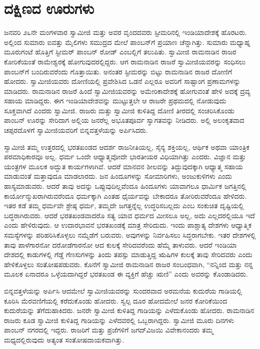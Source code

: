 
\chapter{ದಕ್ಷಿಣದ ಊರುಗಳು}

 ಜನವರಿ ೨೬ನೇ ಮಂಗಳವಾರ ಸ್ವಾಮೀಜಿ ಮತ್ತು ಅವರ ವೃಂದದವರು ಸ್ಟೀಮರಿನಲ್ಲಿ ಇಂಡಿಯಾದೇಶಕ್ಕೆ ಹೊರಟರು. ಅಲ್ಲಿಂದ ಸುಮಾರು ಐವತ್ತು ಮೈಲಿಗಳು ಸಮುದ್ರದ ಮೇಲೆ ಪಾಂಬನ್‌ಗೆ ಪ್ರಯಾಣ ಚೆನ್ನಾಗಿತ್ತು. ಸುಮಾರು ಮಧ್ಯಾಹ್ನ ಮೂರುಗಂಟೆ ಹೊತ್ತಿಗೆ ಸ್ಟೀಮರ್ ಪಾಂಬನ್ ರೋಡ್ ಎಂಬಲ್ಲಿಗೆ ತಲುಪಿತು. ಸ್ವಾಮೀಜಿ ರಾಮನಾಡಿನ ರಾಜರ ಕೋರಿಕೆಯಂತೆ ರಾಮೇಶ್ವರಕ್ಕೆ ಹೋಗುವುದರಲ್ಲಿದ್ದರು. ಆಗ ರಾಮನಾಡಿನ ರಾಜರೆ ಸ್ವಾಮೀಜಿಯವರನ್ನು ಸಂಧಿಸಲು ಪಾಂಬನ್‌ಗೆ ಬಂದಿರುವರೆಂದು ಗೊತ್ತಾಯಿತು. ಅನಂತರ ಸ್ಟೀಮರನ್ನು ಬಿಟ್ಟು ರಾಮನಾಡಿನ ರಾಜರ ದೋಣಿಗೆ ಹೋದರು. ಸ್ವಾಮೀಜಿಯವರು ದೋಣಿಯಲ್ಲಿ ಪ್ರವೇಶಿಸಿದ ಒಡನೆ ಎಲ್ಲರೂ ಅವರಿಗೆ ಸಾಷ್ಟಾಂಗ ಪ್ರಣಾಮಗಳನ್ನು ಮಾಡಿದರು. ರಾಮನಾಡಿನ ರಾಜರೆ ಹಿಂದೆ ಸ್ವಾಮೀಜಿಯವರನ್ನು ಅಮೇರಿಕಾದೇಶಕ್ಕೆ ಹೋಗುವಂತೆ ಹೇಳಿ ಅದಕ್ಕೆ ದ್ರವ್ಯ ಸಹಾಯ ಮಾಡಿದ್ದರು. ಈಗ ಇಂಡಿಯಾದೇಶವನ್ನು ಮುಟ್ಟುತ್ತಲೇ ಆ ರಾಜರೇ ಪ್ರಥಮದಲ್ಲಿ ನೋಡುವುದು ಸೂಕ್ತವಾಗಿದೆ ಎಂದರು ಸ್ವಾಮೀಜಿ. ರಾಜರು ಮತ್ತು ಸ್ವಾಮೀಜಿ ಕುಳಿತಿದ್ದ ದೋಣಿ ತೀರದಲ್ಲಿ ಸಂಚರಿಸಿಕೊಂಡು ಪಾಂಬನ್ ಊರನ್ನು ಸೇರಿದಾಗ ಅಲ್ಲಿಯ ಜನರೆಲ್ಲ ಅಭೂತಪೂರ್ವ ಸ್ವಾಗತವನ್ನು ನೀಡಿದರು. ಅಲ್ಲಿ ಅಲಂಕೃತವಾದ ಚಪ್ಪರದೊಳಗೆ ಸ್ವಾಮೀಜಿಯವರಿಗೆ ಬಿನ್ನವತ್ತಳೆಯನ್ನು ಅರ್ಪಿಸಿದರು. 

 ಸ್ವಾಮೀಜಿ ತಮ್ಮ ಉತ್ತರದಲ್ಲಿ ಭರತಖಂಡದ ಆದರ್ಶ ರಾಜನೀತಿಯಲ್ಲ, ಸೈನ್ಯ ಶಕ್ತಿಯಲ್ಲ, ಆರ್ಥಿಕ ಅಥವಾ ಯಾಂತ್ರಿಕ ಪರಮಾಧಿಕಾರವೂ ಅಲ್ಲ. ಧರ್ಮ ಒಂದೇ ಆಧ್ಯಾತ್ಮವೋದೇ ಭಾರತೀಯರ ವಿಧಿಯಾಗಿತ್ತು ಎಂದರು. ವಿಜ್ಞಾನ ಮತ್ತು ಯಂತ್ರಗಳ ಮೂಲಕ ಅದ್ಭುತ ಕಾರ್ಯಗಳಾಗಿವೆ. ಆದರೆ ಮಾನವನ ಶೀಲವನ್ನು ತಿದ್ದುವುದಕ್ಕಾಗಿ ಆಧ್ಯಾತ್ಮ ಸಹಾಯ ಮಾಡುವಂತೆ ಮತ್ತಾವುದೂ ಮಾಡಲಾರದು. ಜನ ಹಿಂದೂಗಳನ್ನು ಸೋಮಾರಿಗಳು, ಅಂಜುಕುಳಿಗಳು ಎಂದು ಹಾಸ್ಯಮಾಡುವರು. ಆದರೆ ತಾವು ಅದನ್ನು ಒಪ್ಪುವುದಿಲ್ಲವೆಂದೂ ಹಿಂದೂಗಳು ಯಾವಾಗಲೂ ಧಾರ್ಮಿಕ ಜಗತ್ತಿನಲ್ಲಿ ಕಾರ್ಯೋನ್ಮುಖರಾಗಿರುವರೆಂದೂ ಧರ್ಮಕ್ಕಾಗಿ ಎಂತಹ ಧೈರ್ಯವನ್ನು ಬೇಕಾದರೂ ತೋರಿರುವರೆಂದೂ ಹೇಳಿದರು. ಇತರ ಕಡೆ ತಮ್ಮ ಧರ್ಮವೇ ಶ್ರೇಷ್ಠ ಧರ್ಮ, ತಮ್ಮದೇ ಜಗತ್ತನ್ನೆಲ್ಲ ಉದ್ಧರಿಸಬಲ್ಲದು ಎಂಬ ಸಂಕುಚಿತ ದೃಷ್ಟಿಯಲ್ಲಿ ಬದ್ಧರಾಗಿರುವರು. ಆದರೆ ಭರತಖಂಡವಾದರೊ ಸತ್ಯ ಯಾವ ಧರ್ಮದ ಮೀಸಲೂ ಅಲ್ಲ, ಅದು ಎಲ್ಲದರಲ್ಲಿಯೂ ಇದೆ ಎಂದು ಹೇಳಿರುವುದು. ಆ ಉದಾರಭಾವನೆ ಭರತಖಂಡಕ್ಕೆ ಮಾತ್ರ ಸೇರಿದುದು. ಇಂದು ಪಾಶ್ಚಾತ್ಯ ದೇಶಗಳು ಆಧ್ಯಾತ್ಮಿಕ ಸಮಸ್ಯೆಗಳನ್ನು ಪರಿಹರಿಸಿಕೊಳ್ಳಲು ನಮ್ಮೆಡೆಗೆ ಬರುವರು. ಅವುಗಳನ್ನು ನಿರ್ವಹಿಸಲು ಸಿದ್ಧರಾಗಬೇಕು. ಇತರ ದೇಶಗಳಲ್ಲಿ ತಾವು ಪಾಳೆಗಾರನೋ ದರೋಡೆಗಾರನೋ ಆದ ಕುಲಕ್ಕೆ ಸೇರಿದವರೆಂದು ಹೆಮ್ಮೆ ತಾಳುವರು. ಆದರೆ ಇಂಡಿಯಾ ದೇಶದಲ್ಲಿ ಕಾಡುಗಳಲ್ಲಿ ಗೆಡ್ಡೆ ಗೆಣಸುಗಳನ್ನು ತಿಂದು ತಪಸ್ಸು ಮಾಡುತ್ತಿದ್ದ ಋಷಿಗಳ ಕುಲಕ್ಕೆ ತಾವು ಸೇರಿದವರು ಎಂದು ಹೇಳಿಕೊಳ್ಳಲು ಸಂತೋಷಪಡುವರು. ಕೊನೆಗೆ ಸ್ವಾಮೀಜಿ ರಾಮನಾಡಿನ ರಾಜರ ಸಂಬಂಧವಾಗಿ, “ನನ್ನಿಂದ ಮತ್ತು ನನ್ನ ಮೂಲಕ ಏನಾದರೂ ಒಳ್ಳೆಯದಾಗಿದ್ದರೆ ಭರತಖಂಡ ಈ ವ್ಯಕ್ತಿಗೆ ಹೆಚ್ಚು ಋಣಿ” ಎಂದು ಅವರನ್ನು ಕೊಂಡಾಡಿದರು. 

 ಬಿನ್ನವತ್ತಳೆಯನ್ನು ಅರ್ಪಿಸಿ ಆದಮೇಲೆ ಸ್ವಾಮೀಜಿಯವರನ್ನು ಸುಂದರವಾದ ಅರಮನೆಯ ಕುದುರೆಯ ಗಾಡಿಯಲ್ಲಿ ಕೂರಿಸಿ ಮೆರವಣಿಗೆಯಲ್ಲಿ ಕರೆದುಕೊಂಡು ಹೋದರು. ಸ್ವಲ್ಪ ದೂರ ಹೋದಮೇಲೆ ಜನರ ಕೋರಿಕೆಯಿಂದ ಕುದುರೆಯನ್ನು ತೆಗೆದುಹಾಕಿದರು. ಜನರೇ ಸ್ವಾಮೀಜಿ ಕುಳಿತಿದ್ದ ಗಾಡಿಯನ್ನು ಎಳೆದುಕೊಂಡು ಹೋದರು. ರಾಮನಾಡಿನ ರಾಜರು ಕೂಡ ಸ್ವಾಮೀಜಿ ಕುಳಿತಿದ್ದ ಗಾಡಿಯನ್ನು ಎಳೆದವರಲ್ಲಿ ಒಬ್ಬರಾಗಿದ್ದರು. ಸ್ವಾಮೀಜಿ ಮೂರು ದಿನಗಳು ಪಾಂಬನ್ ನಗರದಲ್ಲಿ ಇದ್ದರು. ರಾಜರಿಗೆ ಮತ್ತು ಪ್ರಜೆಗಳಿಗೆ ಜಗದ್‌ವಿಜಯಿ ವಿವೇಕಾನಂದರು ತಮ್ಮ ಮಧ್ಯದಲ್ಲಿರುವುದು ಅತ್ಯಂತ ಸಂತೋಷದಾಯಕವಾಗಿತ್ತು. 

